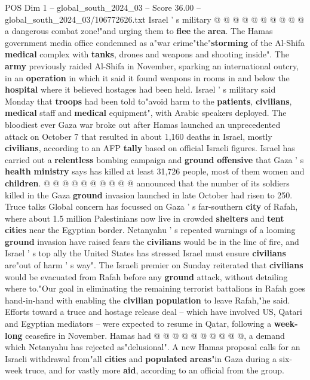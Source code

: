 \begin{textsample}{POS Dim 1 – global\_south\_2024\_03 – Score 36.00 – global\_south\_2024\_03/106772626.txt}
Israel ' s military @ @ @ @ @ @ @ @ @ @ a dangerous combat zone!"and urging them to \textbf{flee} the \textbf{area}.
The Hamas government media office condemned as a"war crime"the"\textbf{storming} of the Al-Shifa \textbf{medical} complex with \textbf{tanks}, drones and weapons and shooting inside".
The \textbf{army} previously raided Al-Shifa in November, sparking an international outcry, in an \textbf{operation} in which it said it found weapons in rooms in and below the \textbf{hospital} where it believed hostages had been held.
Israel ' s military said Monday that \textbf{troops} had been told to"avoid harm to the \textbf{patients}, \textbf{civilians}, \textbf{medical} staff and \textbf{medical} equipment", with Arabic speakers deployed.
The bloodiest ever Gaza war broke out after Hamas launched an unprecedented attack on October 7 that resulted in about 1,160 deaths in Israel, mostly \textbf{civilians}, according to an AFP \textbf{tally} based on official Israeli figures.
Israel has carried out a \textbf{relentless} bombing campaign and \textbf{ground} \textbf{offensive} that Gaza ' s \textbf{health} \textbf{ministry} says has killed at least 31,726 people, most of them women and \textbf{children}. @ @ @ @ @ @ @ @ @ @ announced that the number of its soldiers killed in the Gaza \textbf{ground} invasion launched in late October had risen to 250.
Truce talks Global concern has focussed on Gaza ' s far-southern \textbf{city} of Rafah, where about 1.5 million Palestinians now live in crowded \textbf{shelters} and \textbf{tent} \textbf{cities} near the Egyptian border.
Netanyahu ' s repeated warnings of a looming \textbf{ground} invasion have raised fears the \textbf{civilians} would be in the line of fire, and Israel ' s top ally the United States has stressed Israel must ensure \textbf{civilians} are"out of harm ' s way".
The Israeli premier on Sunday reiterated that \textbf{civilians} would be evacuated from Rafah before any \textbf{ground} attack, without detailing where to."Our goal in eliminating the remaining terrorist battalions in Rafah goes hand-in-hand with enabling the \textbf{civilian} \textbf{population} to leave Rafah,"he said.
Efforts toward a truce and hostage release deal -- which have involved US, Qatari and Egyptian mediators -- were expected to resume in Qatar, following a \textbf{week-long} ceasefire in November.
Hamas had @ @ @ @ @ @ @ @ @ @, a demand which Netanyahu has rejected as"delusional".
A new Hamas proposal calls for an Israeli withdrawal from"all \textbf{cities} and \textbf{populated} \textbf{areas}"in Gaza during a six-week truce, and for vastly more \textbf{aid}, according to an official from the group.

\end{textsample}
